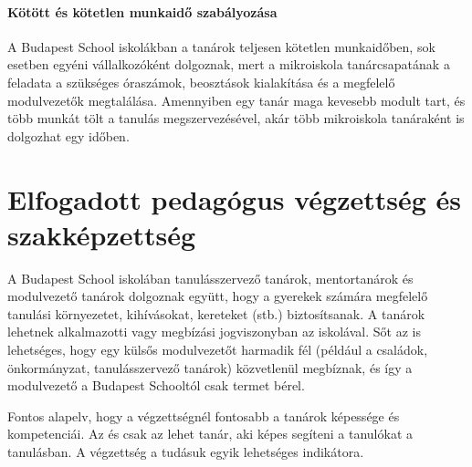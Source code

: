 \paragraph{Kötött és kötetlen munkaidő szabályozása}

A Budapest School  iskolákban a tanárok teljesen kötetlen munkaidőben, sok
esetben egyéni vállalkozóként dolgoznak, mert a mikroiskola tanárcsapatának a
feladata a szükséges óraszámok, beosztások kialakítása és a megfelelő
modulvezetők megtalálása. Amennyiben egy tanár maga kevesebb modult tart, és
több munkát tölt a tanulás megszervezésével, akár több mikroiskola tanáraként
is dolgozhat egy időben.

\section{Elfogadott pedagógus végzettség és szakképzettség}

A Budapest School iskolában tanulásszervező tanárok, mentortanárok és
modulvezető tanárok dolgoznak együtt, hogy a gyerekek számára megfelelő
tanulási környezetet, kihívásokat, kereteket (stb.) biztosítsanak. A tanárok
lehetnek alkalmazotti vagy megbízási jogviszonyban az iskolával. Sőt az is
lehetséges, hogy egy külsős modulvezetőt harmadik fél (például a családok,
önkormányzat, tanulásszervező tanárok) közvetlenül megbíznak, és így a
modulvezető a Budapest Schooltól csak termet bérel.

Fontos alapelv, hogy a végzettségnél fontosabb a tanárok képessége és
kompetenciái. Az és csak az lehet tanár, aki képes segíteni a tanulókat a
tanulásban. A végzettség a tudásuk egyik lehetséges indikátora.

